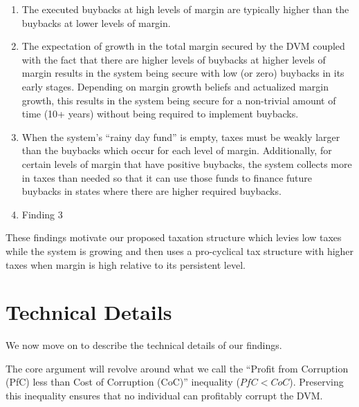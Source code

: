 \documentclass[12pt]{article}
\begin{document}
  \begin{enumerate}
    \item The executed buybacks at high levels of margin are typically higher than the buybacks at
          lower levels of margin.
    \item The expectation of growth in the total margin secured by the DVM coupled with the fact
          that there are higher levels of buybacks at higher levels of margin results in the system
          being secure with low (or zero) buybacks in its early stages. Depending on margin growth
          beliefs and actualized margin growth, this results in the system being secure for a
          non-trivial amount of time (10+ years) without being required to implement buybacks.
    \item When the system's ``rainy day fund'' is empty, taxes must be weakly larger than the
          buybacks which occur for each level of margin. Additionally, for certain levels of margin
          that have positive buybacks, the system collects more in taxes than needed so that it can
          use those funds to finance future buybacks in states where there are higher required
          buybacks.
    \item Finding 3
  \end{enumerate}

  These findings motivate our proposed taxation structure which levies low taxes while the system
  is growing and then uses a pro-cyclical tax structure with higher taxes when margin is high
  relative to its persistent level.

  \clearpage
  \newpage

\section{Technical Details}

  We now move on to describe the technical details of our findings.

  The core argument will revolve around what we call the ``Profit from Corruption (PfC) less than
  Cost of Corruption (CoC)'' inequality ($PfC < CoC$). Preserving this inequality ensures that no
  individual can profitably corrupt the DVM.
\end{document}
